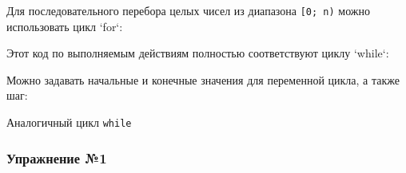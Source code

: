 Для последовательного перебора целых чисел из диапазона
\texttt{{[}0;\ n)} можно использовать цикл `for`:

\begin{Shaded}
\begin{Highlighting}[]
  \NormalTok{(}\NormalTok{):}
\end{Highlighting}
\end{Shaded}

Этот код по выполняемым действиям полностью соответствуют циклу `while`:

\begin{Shaded}
\begin{Highlighting}[]
\OperatorTok{=} 
 \OperatorTok{<} \NormalTok{:}
  \OperatorTok{+=} 
\end{Highlighting}
\end{Shaded}

Можно задавать начальные и конечные значения для переменной цикла, а
также шаг:

\begin{Shaded}
\begin{Highlighting}[]
  \NormalTok{(}\NormalTok{, }\NormalTok{, }\OperatorTok{-}\NormalTok{):}
\end{Highlighting}
\end{Shaded}

Аналогичный цикл \texttt{while}

\begin{Shaded}
\begin{Highlighting}[]
\OperatorTok{=} 
 \OperatorTok{>} \NormalTok{:}
  \OperatorTok{-=} 
\end{Highlighting}
\end{Shaded}

\subsubsection{Упражнение
№1}\label{ux443ux43fux440ux430ux436ux43dux435ux43dux438ux435-1}

